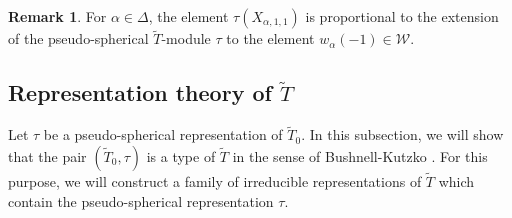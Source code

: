 \documentclass[10pt, letterpaper]{amsart}
\theoremstyle{plain}
\theoremstyle{definition}
\newtheorem*{Rmk}{Remark}
\numberwithin{equation}{section}
\newcommand{\Tt}{\widetilde{T}}
\newcommand{\Wcal}{\mathcal{W}}
\begin{document}
\begin{Rmk}
For $\alpha\in \Delta$, the element $\tau(X_{\alpha,1,1})$ is proportional to the extension of the pseudo-spherical $\Tt$-module $\tau$ to the element $w_{\alpha}(-1)\in\Wcal$.
\end{Rmk}


\subsection{Representation theory of $\Tt$}\label{TtReps}


Let $\tau$ be a pseudo-spherical representation of $\Tt_0$. In this subsection, we will show that the pair $(\Tt_0, \tau)$ is a type of $\Tt$ in the sense of Bushnell-Kutzko \cite[(4.1) Definition]{BK98}. For this purpose, we will construct a family of irreducible representations of $\Tt$ which contain the pseudo-spherical representation $\tau$.
\end{document}
